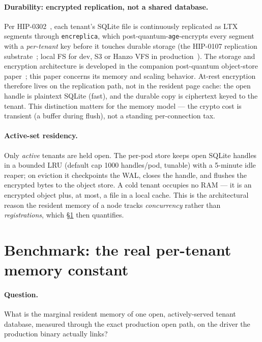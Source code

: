 \documentclass[11pt]{article}
\begin{document}
\paragraph{Durability: encrypted replication, not a shared database.}
Per HIP-0302~\cite{hip0302}, each tenant's SQLite file is continuously replicated as LTX
segments through \texttt{encreplica}, which post-quantum-\texttt{age}-encrypts every segment
with a \emph{per-tenant} key before it touches durable storage (the HIP-0107 replication
substrate~\cite{hip0107}; local FS for dev, S3 or Hanzo VFS in production~\cite{hip0032}). The
storage and encryption architecture is developed in the companion post-quantum object-store
paper~\cite{pqstore}; this paper concerns its memory and scaling behavior. At-rest encryption
therefore lives on the replication path,
not in the resident page cache: the open handle is plaintext SQLite (fast), and the durable
copy is ciphertext keyed to the tenant. This distinction matters for the memory model --- the
crypto cost is transient (a buffer during flush), not a standing per-connection tax.

\paragraph{Active-set residency.}
Only \emph{active} tenants are held open. The per-pod store keeps open SQLite handles in a
bounded LRU (default cap 1000 handles/pod, tunable) with a 5-minute idle reaper; on eviction it
checkpoints the WAL, closes the handle, and flushes the encrypted bytes to the object store. A
cold tenant occupies no RAM --- it is an encrypted object plus, at most, a file in a local
cache. This is the architectural reason the resident memory of a node tracks \emph{concurrency}
rather than \emph{registrations}, which \S\ref{sec:bench} then quantifies.

\section{Benchmark: the real per-tenant memory constant}
\label{sec:bench}

\paragraph{Question.}
What is the marginal resident memory of one open, actively-served tenant database, measured
through the exact production open path, on the driver the production binary actually links?
\end{document}
